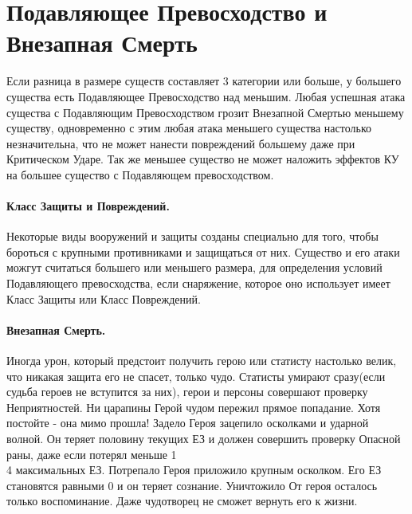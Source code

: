 \section{Подавляющее Превосходство и Внезапная Смерть}
Если разница в размере существ составляет 3 категории или больше, у большего существа есть Подавляющее Превосходство над меньшим. Любая успешная атака существа с Подавляющим Превосходством грозит Внезапной Смертью меньшему существу, одновременно с этим любая атака меньшего существа настолько незначительна, что не может нанести повреждений большему даже при Критическом Ударе. Так же меньшее существо не может наложить эффектов КУ на большее существо с Подавляющем превосходством.
\paragraph{Класс Защиты и Повреждений.} Некоторые виды вооружений и защиты созданы специально для того, чтобы бороться с крупными противниками и защищаться от них. Существо и его атаки можгут считаться большего или меньшего размера, для определения условий Подавляющего превосходства, если снаряжение, которое оно использует имеет Класс Защиты или Класс Повреждений.

\paragraph{Внезапная Смерть.} Иногда урон, который предстоит получить герою или статисту настолько велик, что никакая защита его не спасет, только чудо. Статисты умирают сразу(если судьба героев не вступится за них), герои и персоны совершают проверку Неприятностей.
\trouble
{Ни царапины}%
{Герой чудом пережил прямое попадание. Хотя постойте - она мимо прошла!}%
{Задело}%
{Героя зацепило осколками и ударной волной. Он теряет половину текущих ЕЗ и должен совершить проверку Опасной раны, даже если потерял меньше 1\\4 максимальных ЕЗ.}%
{Потрепало}%
{Героя приложило крупным осколком. Его ЕЗ становятся равными 0 и он теряет сознание.}%
{Уничтожило}%
{От героя осталось только воспоминание. Даже чудотворец не сможет вернуть его к жизни.}%
